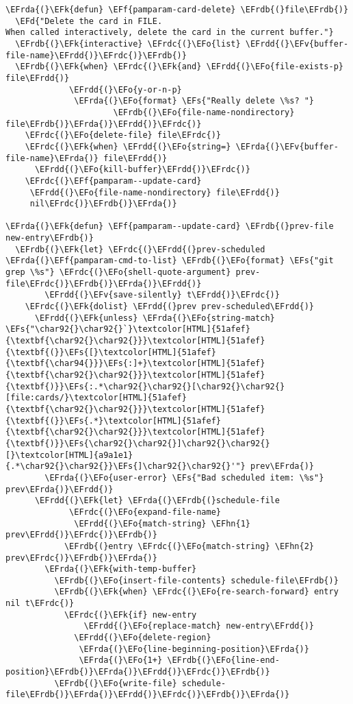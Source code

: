 \documentclass[a4wide,10pt]{article}
\newcommand{\EFs}[1]{\textcolor{EFs}{#1}} %
\newcommand{\EFd}[1]{\textcolor{EFd}{#1}} %
\newcommand{\EFk}[1]{\textcolor{EFk}{#1}} %
\newcommand{\EFf}[1]{\textcolor{EFf}{#1}} %
\newcommand{\EFv}[1]{\textcolor{EFv}{#1}} %
\newcommand{\EFo}[1]{\textcolor{EFo}{#1}} %
\newcommand{\EFhn}[1]{\textcolor{EFhn}{\textbf{#1}}} %
\newcommand{\EFrda}[1]{\textcolor{EFrda}{#1}} %
\newcommand{\EFrdb}[1]{\textcolor{EFrdb}{#1}} %
\newcommand{\EFrdc}[1]{\textcolor{EFrdc}{#1}} %
\newcommand{\EFrdd}[1]{\textcolor{EFrdd}{#1}} %
\begin{document}
\begin{Code}
\begin{Verbatim}
\EFrda{(}\EFk{defun} \EFf{pamparam-card-delete} \EFrdb{(}file\EFrdb{)}
  \EFd{"Delete the card in FILE.
When called interactively, delete the card in the current buffer."}
  \EFrdb{(}\EFk{interactive} \EFrdc{(}\EFo{list} \EFrdd{(}\EFv{buffer-file-name}\EFrdd{)}\EFrdc{)}\EFrdb{)}
  \EFrdb{(}\EFk{when} \EFrdc{(}\EFk{and} \EFrdd{(}\EFo{file-exists-p} file\EFrdd{)}
             \EFrdd{(}\EFo{y-or-n-p}
              \EFrda{(}\EFo{format} \EFs{"Really delete \%s? "}
                      \EFrdb{(}\EFo{file-name-nondirectory} file\EFrdb{)}\EFrda{)}\EFrdd{)}\EFrdc{)}
    \EFrdc{(}\EFo{delete-file} file\EFrdc{)}
    \EFrdc{(}\EFk{when} \EFrdd{(}\EFo{string=} \EFrda{(}\EFv{buffer-file-name}\EFrda{)} file\EFrdd{)}
      \EFrdd{(}\EFo{kill-buffer}\EFrdd{)}\EFrdc{)}
    \EFrdc{(}\EFf{pamparam--update-card}
     \EFrdd{(}\EFo{file-name-nondirectory} file\EFrdd{)}
     nil\EFrdc{)}\EFrdb{)}\EFrda{)}

\EFrda{(}\EFk{defun} \EFf{pamparam--update-card} \EFrdb{(}prev-file new-entry\EFrdb{)}
  \EFrdb{(}\EFk{let} \EFrdc{(}\EFrdd{(}prev-scheduled \EFrda{(}\EFf{pamparam-cmd-to-list} \EFrdb{(}\EFo{format} \EFs{"git grep \%s"} \EFrdc{(}\EFo{shell-quote-argument} prev-file\EFrdc{)}\EFrdb{)}\EFrda{)}\EFrdd{)}
        \EFrdd{(}\EFv{save-silently} t\EFrdd{)}\EFrdc{)}
    \EFrdc{(}\EFk{dolist} \EFrdd{(}prev prev-scheduled\EFrdd{)}
      \EFrdd{(}\EFk{unless} \EFrda{(}\EFo{string-match} \EFs{"\char92{}\char92{}`}\textcolor[HTML]{51afef}{\textbf{\char92{}\char92{}}}\textcolor[HTML]{51afef}{\textbf{(}}\EFs{[}\textcolor[HTML]{51afef}{\textbf{\char94{}}}\EFs{:]+}\textcolor[HTML]{51afef}{\textbf{\char92{}\char92{}}}\textcolor[HTML]{51afef}{\textbf{)}}\EFs{:.*\char92{}\char92{}[\char92{}\char92{}[file:cards/}\textcolor[HTML]{51afef}{\textbf{\char92{}\char92{}}}\textcolor[HTML]{51afef}{\textbf{(}}\EFs{.*}\textcolor[HTML]{51afef}{\textbf{\char92{}\char92{}}}\textcolor[HTML]{51afef}{\textbf{)}}\EFs{\char92{}\char92{}]\char92{}\char92{}[}\textcolor[HTML]{a9a1e1}{.*\char92{}\char92{}}\EFs{]\char92{}\char92{}'"} prev\EFrda{)}
        \EFrda{(}\EFo{user-error} \EFs{"Bad scheduled item: \%s"} prev\EFrda{)}\EFrdd{)}
      \EFrdd{(}\EFk{let} \EFrda{(}\EFrdb{(}schedule-file
             \EFrdc{(}\EFo{expand-file-name}
              \EFrdd{(}\EFo{match-string} \EFhn{1} prev\EFrdd{)}\EFrdc{)}\EFrdb{)}
            \EFrdb{(}entry \EFrdc{(}\EFo{match-string} \EFhn{2} prev\EFrdc{)}\EFrdb{)}\EFrda{)}
        \EFrda{(}\EFk{with-temp-buffer}
          \EFrdb{(}\EFo{insert-file-contents} schedule-file\EFrdb{)}
          \EFrdb{(}\EFk{when} \EFrdc{(}\EFo{re-search-forward} entry nil t\EFrdc{)}
            \EFrdc{(}\EFk{if} new-entry
                \EFrdd{(}\EFo{replace-match} new-entry\EFrdd{)}
              \EFrdd{(}\EFo{delete-region}
               \EFrda{(}\EFo{line-beginning-position}\EFrda{)}
               \EFrda{(}\EFo{1+} \EFrdb{(}\EFo{line-end-position}\EFrdb{)}\EFrda{)}\EFrdd{)}\EFrdc{)}\EFrdb{)}
          \EFrdb{(}\EFo{write-file} schedule-file\EFrdb{)}\EFrda{)}\EFrdd{)}\EFrdc{)}\EFrdb{)}\EFrda{)}


\end{Verbatim}
\end{Code}
\end{document}
